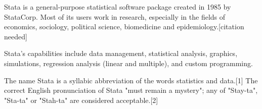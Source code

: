 Stata is a general-purpose statistical software package created in 1985 by StataCorp. Most of its users work in research, especially in the fields of economics, sociology, political science, biomedicine and epidemiology.[citation needed]
 
Stata's capabilities include data management, statistical analysis, graphics, simulations, regression analysis (linear and multiple), and custom programming.
 
The name Stata is a syllabic abbreviation of the words statistics and data.[1] The correct English pronunciation of Stata "must remain a mystery"; any of "Stay-ta", "Sta-ta" or "Stah-ta" are considered acceptable.[2]
